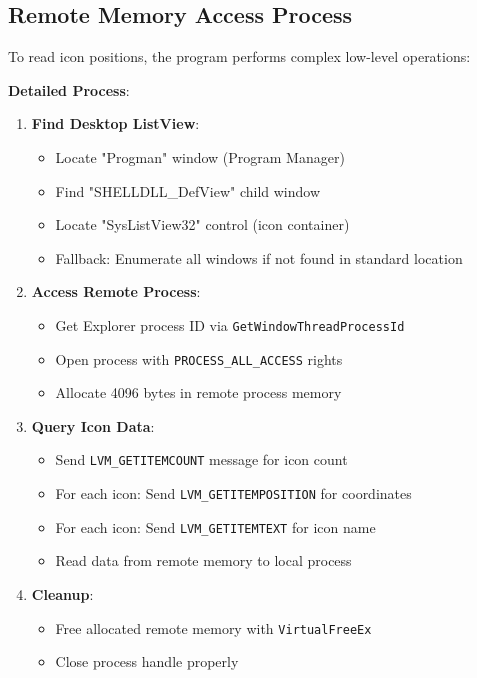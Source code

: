 \documentclass[a4paper,11pt]{article}
\begin{document}
\subsection{Remote Memory Access Process}

To read icon positions, the program performs complex low-level operations:

\textbf{Detailed Process}:
\begin{enumerate}
  \item \textbf{Find Desktop ListView}:
    \begin{itemize}
      \item Locate "Progman" window (Program Manager)
      \item Find "SHELLDLL\_DefView" child window
      \item Locate "SysListView32" control (icon container)
      \item Fallback: Enumerate all windows if not found in standard location
    \end{itemize}

  \item \textbf{Access Remote Process}:
    \begin{itemize}
      \item Get Explorer process ID via \texttt{GetWindowThreadProcessId}
      \item Open process with \texttt{PROCESS\_ALL\_ACCESS} rights
      \item Allocate 4096 bytes in remote process memory
    \end{itemize}

  \item \textbf{Query Icon Data}:
    \begin{itemize}
      \item Send \texttt{LVM\_GETITEMCOUNT} message for icon count
      \item For each icon: Send \texttt{LVM\_GETITEMPOSITION} for coordinates
      \item For each icon: Send \texttt{LVM\_GETITEMTEXT} for icon name
      \item Read data from remote memory to local process
    \end{itemize}

  \item \textbf{Cleanup}:
    \begin{itemize}
      \item Free allocated remote memory with \texttt{VirtualFreeEx}
      \item Close process handle properly
    \end{itemize}
\end{enumerate}
\end{document}
